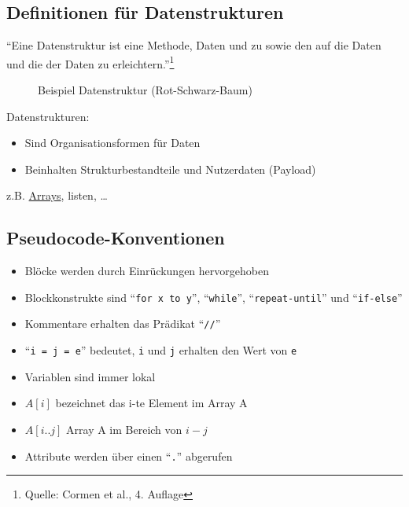 \documentclass[
    12pt,
    a4paper,
    ngerman,
    color=3b,%
    marginpar=false,
    colorback=false,
    leqno,
]{tudaexercise}
\begin{document}
\subsection{Definitionen für Datenstrukturen}\label{1.3}\label{Definitionen fuer Datenstrukturen}
"`Eine Datenstruktur ist eine Methode,
Daten  und zu  sowie
den  auf die Daten und die 
der Daten zu erleichtern."'\footnote{Quelle: Cormen et al., 4. Auflage}\\
\begin{wrapfigure}[5]{r}{.6\textwidth}
    \centering
    \caption{Beispiel Datenstruktur (Rot-Schwarz-Baum)}
    \label{fig:baum_beispiel}
\end{wrapfigure}
Datenstrukturen:\begin{itemize}
    \item Sind Organisationsformen für Daten
    \item Beinhalten Strukturbestandteile und Nutzerdaten (Payload)
\end{itemize}
z.B. \hyperref[2.2]{Arrays}, listen, \ldots
\vspace*{2cm}
\subsection{Pseudocode-Konventionen}
\begin{itemize}
    \item Blöcke werden durch Einrückungen hervorgehoben
    \item Blockkonstrukte sind "`\texttt{for x to y}"', "`\texttt{while}"', "`\texttt{repeat-until}"' und "`\texttt{if-else}"'
    \item Kommentare erhalten das Prädikat "`\texttt{//}"'
    \item "`\texttt{i = j = e}"' bedeutet, \texttt{i} und \texttt{j} erhalten den Wert von \texttt{e}
    \item Variablen sind immer lokal
    \item $A[i]$ bezeichnet das i-te Element im Array A
    \item $A[i..j]$ Array A im Bereich von $i-j$
    \item Attribute werden über einen "`\texttt{.}"' abgerufen
\end{itemize}
\end{document}
